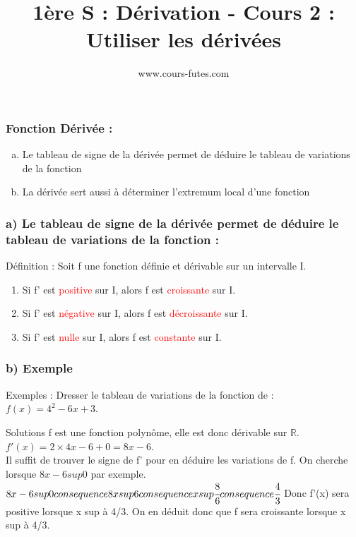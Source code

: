 \documentclass[t]{beamer}
\title{1ère S : Dérivation - Cours 2 : Utiliser les dérivées}
\author{www.cours-futes.com}
\institute{Sébastien Harinck}
\date{}
\begin{document}
\begin{frame}
\titlepage
\end{frame}

\begin{frame}[label=pagebanale]
\frametitle{Fonction Dérivée :}
\pause
\begin{enumerate}[a)]
\item<+-> Le tableau de signe de la dérivée permet de déduire le tableau de variations de la fonction
\item<+-> La dérivée sert aussi à déterminer l'extremum local d'une fonction
\end{enumerate}
\end{frame}

\begin{frame}[label=pagebanale]
\frametitle{a) Le tableau de signe de la dérivée permet de déduire le tableau de variations de la fonction : }
\pause
\begin{block}{Définition :}
\pause
Soit f une fonction définie et dérivable sur un intervalle I. \pause
\begin{enumerate}[]
	\item<+-> Si f' est \textcolor{red}{positive} sur I, \pause alors f est \textcolor{red}{croissante} sur I. \pause
	\item<+-> Si f' est \textcolor{red}{négative} sur I, \pause alors f est \textcolor{red}{décroissante} sur I. \pause
	\item<+-> Si f' est \textcolor{red}{nulle} sur I, \pause alors f est \textcolor{red}{constante} sur I.
\end{enumerate}
\pause
\end{block}
\end{frame}

\begin{frame}[label=pagebanale]
\frametitle{b) Exemple}
\begin{block}{Exemples : }
Dresser le tableau de variations de la fonction de : $f(x) = 4^2 - 6x + 3$. 
\end{block}
\begin{block}{Solutions }
f est une fonction polynôme, elle est donc dérivable sur $\mathbb{R}$. $f'(x) = 2 \times 4 x - 6 + 0 = 8x - 6$. \\
\pause
Il suffit de trouver le signe de f' pour en déduire les variations de f. On cherche lorsque $ 8x - 6 sup 0$ par exemple.
$ 8x - 6 sup 0 consequence 8x  sup 6 consequence x sup \cfrac{8}{6} consequence \cfrac{4}{3}$ Donc f'(x) sera positive lorsque x sup à 4/3. On en déduit donc que f sera croissante lorsque x sup à 4/3. 
\end{block}
\end{frame}
\end{document}

